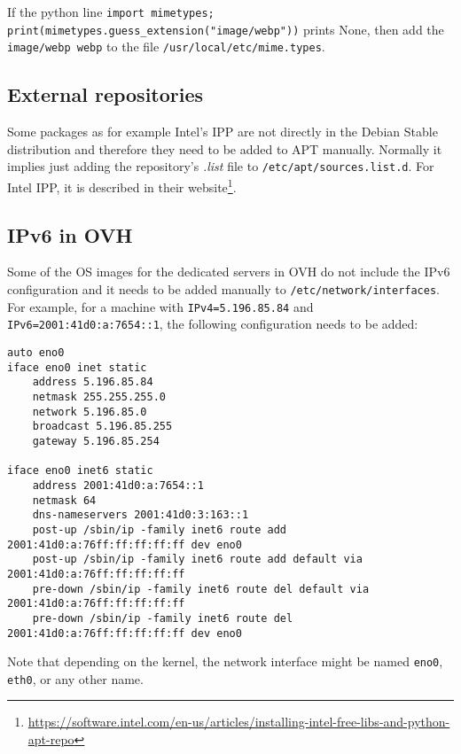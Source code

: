 \documentclass[a4paper,12pt]{article}
\begin{document}
If the python line {\tt import mimetypes; print(mimetypes.guess\_extension("image/webp"))} prints None, then add the {\tt image/webp webp} to the file {\tt /usr/local/etc/mime.types}.

\subsection{External repositories}
Some packages as for example Intel's IPP are not directly in the Debian Stable distribution and therefore they need to be added to APT manually. Normally it implies just adding the repository's \emph{.list} file to {\tt /etc/apt/sources.list.d}.
For Intel IPP, it is described in their website\footnote{\url{https://software.intel.com/en-us/articles/installing-intel-free-libs-and-python-apt-repo}}.

\subsection{IPv6 in OVH}
Some of the OS images for the dedicated servers in OVH do not include the IPv6 configuration and it needs to be added manually to {\tt /etc/network/interfaces}.
For example, for a machine with {\tt IPv4=5.196.85.84} and {\tt IPv6=2001:41d0:a:7654::1}, the following configuration needs to be added:

\begin{verbatim}
auto eno0
iface eno0 inet static
    address 5.196.85.84
    netmask 255.255.255.0
    network 5.196.85.0
    broadcast 5.196.85.255
    gateway 5.196.85.254

iface eno0 inet6 static
    address 2001:41d0:a:7654::1
    netmask 64
    dns-nameservers 2001:41d0:3:163::1
    post-up /sbin/ip -family inet6 route add 2001:41d0:a:76ff:ff:ff:ff:ff dev eno0
    post-up /sbin/ip -family inet6 route add default via 2001:41d0:a:76ff:ff:ff:ff:ff
    pre-down /sbin/ip -family inet6 route del default via 2001:41d0:a:76ff:ff:ff:ff:ff
    pre-down /sbin/ip -family inet6 route del 2001:41d0:a:76ff:ff:ff:ff:ff dev eno0
\end{verbatim}

Note that depending on the kernel, the network interface might be named {\tt eno0}, {\tt eth0}, or any other name.


\begin{comment}
\subsection{Manual configurations}
Some of the installed packages need manual changes in their configuration.

- Octave: edit the file {\tt /usr/share/octave/site/m/startup/octaverc} and {\tt add pkg load image}.
\end{comment}
\end{document}
